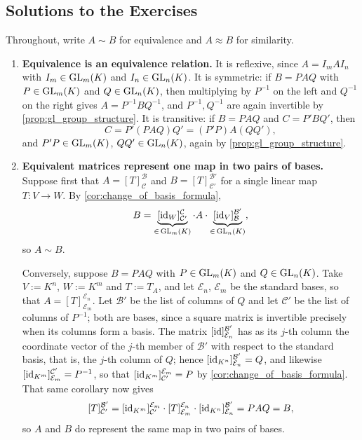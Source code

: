 \subsection{Solutions to the Exercises}
\label{sec:solutions_change_of_basis}

\begin{exercisesolution}
\label{sol:equivalence_similarity_properties}
Throughout, write $A \sim B$ for equivalence and $A \approx B$ for similarity.

\begin{enumerate}[label=\textbf{(\alph*)}]
    \item \textbf{Equivalence is an equivalence relation.} It is reflexive, since $A = I_m A I_n$ with $I_m \in \operatorname{GL}_m(K)$ and $I_n \in \operatorname{GL}_n(K)$. It is symmetric: if $B = PAQ$ with $P \in \operatorname{GL}_m(K)$ and $Q \in \operatorname{GL}_n(K)$, then multiplying by $P^{-1}$ on the left and $Q^{-1}$ on the right gives $A = P^{-1} B Q^{-1}$, and $P^{-1}, Q^{-1}$ are again invertible by \cref{prop:gl_group_structure}. It is transitive: if $B = PAQ$ and $C = P'BQ'$, then
    \[
    C = P'(PAQ)Q' = (P'P) A (QQ'),
    \]
    and $P'P \in \operatorname{GL}_m(K)$, $QQ' \in \operatorname{GL}_n(K)$, again by \cref{prop:gl_group_structure}.

    \item \textbf{Equivalent matrices represent one map in two pairs of bases.} Suppose first that $A = [T]_{\mathcal{C}}^{\mathcal{B}}$ and $B = [T]_{\mathcal{C}'}^{\mathcal{B}'}$ for a single linear map $T: V \to W$. By \cref{cor:change_of_basis_formula},
    \[
    B = \underbrace{[\operatorname{id}_W]_{\mathcal{C}'}^{\mathcal{C}}}_{\in \, \operatorname{GL}_m(K)} \cdot A \cdot \underbrace{[\operatorname{id}_V]_{\mathcal{B}}^{\mathcal{B}'}}_{\in \, \operatorname{GL}_n(K)},
    \]
    so $A \sim B$.

    Conversely, suppose $B = PAQ$ with $P \in \operatorname{GL}_m(K)$ and $Q \in \operatorname{GL}_n(K)$. Take $V := K^n$, $W := K^m$ and $T := T_A$, and let $\mathcal{E}_n$, $\mathcal{E}_m$ be the standard bases, so that $A = [T]_{\mathcal{E}_m}^{\mathcal{E}_n}$. Let $\mathcal{B}'$ be the list of columns of $Q$ and let $\mathcal{C}'$ be the list of columns of $P^{-1}$; both are bases, since a square matrix is invertible precisely when its columns form a basis. The matrix $[\operatorname{id}]_{\mathcal{E}_n}^{\mathcal{B}'}$ has as its $j$-th column the coordinate vector of the $j$-th member of $\mathcal{B}'$ with respect to the standard basis, that is, the $j$-th column of $Q$; hence $[\operatorname{id}_{K^n}]_{\mathcal{E}_n}^{\mathcal{B}'} = Q$, and likewise $[\operatorname{id}_{K^m}]_{\mathcal{E}_m}^{\mathcal{C}'} = P^{-1}$, so that $[\operatorname{id}_{K^m}]_{\mathcal{C}'}^{\mathcal{E}_m} = P$ by \cref{cor:change_of_basis_formula}. That same corollary now gives
    \[
    [T]_{\mathcal{C}'}^{\mathcal{B}'} = [\operatorname{id}_{K^m}]_{\mathcal{C}'}^{\mathcal{E}_m} \cdot [T]_{\mathcal{E}_m}^{\mathcal{E}_n} \cdot [\operatorname{id}_{K^n}]_{\mathcal{E}_n}^{\mathcal{B}'} = P A Q = B,
    \]
    so $A$ and $B$ do represent the same map in two pairs of bases.


\end{enumerate}
\end{exercisesolution}
